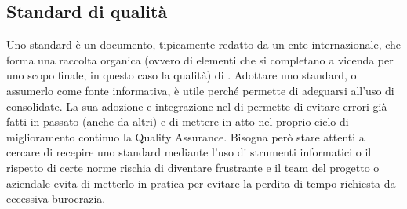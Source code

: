 \documentclass[../main]{subfiles}
\begin{document}
\subsection{Standard di qualità}
Uno standard è un documento, tipicamente redatto da un ente internazionale, che forma una raccolta organica (ovvero di elementi che si completano a vicenda per uno scopo finale, in questo caso la qualità) di .
Adottare uno standard, o assumerlo come fonte informativa, è utile perché permette di adeguarsi all'uso di  consolidate. La sua adozione e integrazione nel  di  permette di evitare errori già fatti in passato (anche da altri) e di mettere in atto nel proprio ciclo di miglioramento continuo la Quality Assurance.
Bisogna però stare attenti a cercare di recepire uno standard mediante l'uso di strumenti informatici o il rispetto di certe norme rischia di diventare frustrante e il team del progetto o aziendale evita di metterlo in pratica per evitare la perdita di tempo richiesta da eccessiva burocrazia.
\end{document}
